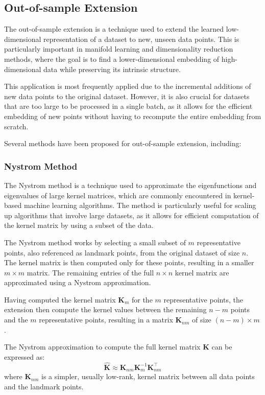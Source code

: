     \subsection{Out-of-sample Extension}
        The out-of-sample extension is a technique used to extend the learned low-dimensional representation of a dataset to new, unseen data points. This is particularly important in manifold learning and dimensionality reduction methods, where the goal is to find a lower-dimensional embedding of high-dimensional data while preserving its intrinsic structure.

        This application is most frequently applied due to the incremental additions of new data points to the original dataset. However, it is also crucial for datasets that are too large to be processed in a single batch, as it allows for the efficient embedding of new points without having to recompute the entire embedding from scratch.

        Several methods have been proposed for out-of-sample extension, including:


        \subsubsection{Nystrom Method}
            The Nystrom method \cite{nystrom} is a technique used to approximate the eigenfunctions and eigenvalues of large kernel matrices, which are commonly encountered in kernel-based machine learning algorithms. The method is particularly useful for scaling up algorithms that involve large datasets, as it allows for efficient computation of the kernel matrix by using a subset of the data.

            The Nystrom method works by selecting a small subset of $m$ representative points, also referenced as landmark points, from the original dataset of size $n$. The kernel matrix is then computed only for these points, resulting in a smaller $m \times m$ matrix. The remaining entries of the full $n \times n$ kernel matrix are approximated using a Nystrom approximation.

            Having computed the kernel matrix $\boldsymbol{K}_m$ for the $m$ representative points, the extension then compute the kernel values between the remaining $n-m$ points and the $m$ representative points, resulting in a matrix $\boldsymbol{K}_{nm}$ of size $(n-m) \times m$.

            The Nystrom approximation to compute the full kernel matrix $\boldsymbol{K}$ can be expressed as:
            \begin{equation}
                \hat{\boldsymbol{K}} \approx \boldsymbol{K}_{nm} \boldsymbol{K}_m^{-1} \boldsymbol{K}_{nm}^\top
            \end{equation}
            where $\boldsymbol{K}_{nm}$ is a simpler, usually low-rank, kernel matrix between all data points and the landmark points.

